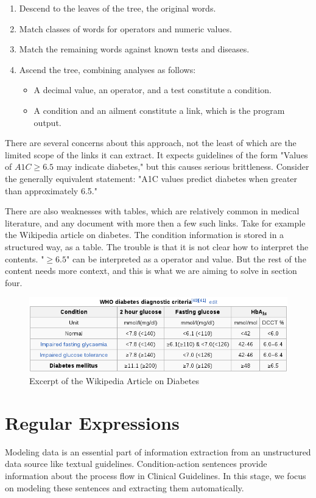 \documentclass[12pt,letterpaper]{article}
\begin{document}
\begin{enumerate}
\item Descend to the leaves of the tree, the original words.
\item Match classes of words for operators and numeric values.
\item Match the remaining words against known tests and diseases.
\item Ascend the tree, combining analyses as follows:
\begin{itemize}
	\item A decimal value, an operator, and a test constitute a condition.
	\item A condition and an ailment constitute a link, which is the program output.
\end{itemize}
\end{enumerate}

There are several concerns about this approach, not the least of which are the limited scope of the links it can extract. It expects guidelines of the form
"Values of $A1C \geq 6.5$ may indicate diabetes," but this causes serious brittleness. Consider the generally equivalent statement: "A1C values predict diabetes when greater than approximately 6.5."

There are also weaknesses with tables, which are relatively common in medical literature, and any document with more then a few such links. Take for example the Wikipedia article on diabetes. The condition information is stored in a structured way, as a table. The trouble is that it is not clear how to interpret the contents. "$\geq 6.5$" can be interpreted as a operator and value. But the rest of the content needs more context, and this is what we are aiming to solve in section four.
\begin{figure}
\includegraphics[width=\textwidth]{WikipediaA1CTable}
\caption{Excerpt of the Wikipedia Article on Diabetes}
\end{figure}
\section{Regular Expressions}
Modeling data is an essential part of information extraction from an unstructured data source like textual guidelines. Condition-action sentences provide information about the process flow in Clinical Guidelines. In this stage, we focus on modeling these sentences and extracting them automatically.
\end{document}

